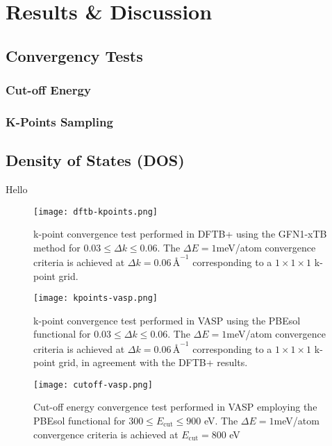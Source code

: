 \chapter{Results \& Discussion}
\label{Chapter4}

\section{Convergency Tests}
\subsection{Cut-off Energy}
\subsection{K-Points Sampling}
\section{Density of States (DOS)}



Hello




\begin{figure}[h]
    \centering
    \texttt{[image: dftb-kpoints.png]}
    \caption{k-point convergence test performed in DFTB+ using the GFN1-xTB method for $0.03 \leq \Delta k \leq 0.06$. The 
    $\Delta E = 1$meV/atom convergence criteria is achieved at $\Delta k = 0.06 \,\text{\AA}^{-1}$ corresponding to a $1\times 1\times 1$ k-point grid.
    }
    \label{dftb-kpoints}
\end{figure}

\begin{figure}[h]
    \centering
    \texttt{[image: kpoints-vasp.png]}
    \caption{k-point convergence test performed in VASP using the PBEsol functional for $0.03 \leq \Delta k \leq 0.06$. The $\Delta E = 1$meV/atom convergence criteria is achieved at $\Delta k = 0.06 \,\text{\AA}^{-1}$ corresponding to a $1\times 1\times 1$ k-point grid, in agreement with the DFTB+ results.
    }
    \label{kpoints-vasp}
\end{figure}

\begin{figure}[h]
    \centering
    \texttt{[image: cutoff-vasp.png]}
    \caption{
    Cut-off energy convergence test performed in VASP employing the PBEsol functional for $300 \leq E_{\text{cut}} \leq 900$ eV. The $\Delta E = 1$meV/atom convergence criteria is achieved at $E_{\text {cut}} = 800$ eV}
    \label{cutoff-energy}
\end{figure}

